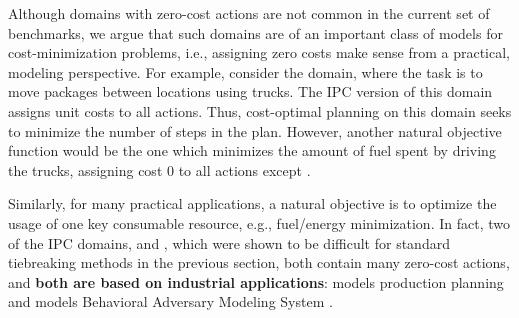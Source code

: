 
Although domains with zero-cost actions are not common in the current set of benchmarks, we argue that such domains are of an important class of models for cost-minimization problems, i.e.,
assigning zero costs make sense from a practical, modeling perspective.
For example, consider the  domain, where the task is to move packages between locations using trucks.
The IPC version of this domain assigns unit costs to all actions. Thus, cost-optimal planning on this domain seeks to minimize the number of steps in the plan.
However, another natural objective function would be the one which minimizes the amount of fuel spent by driving the trucks,
assigning cost 0 to all actions except .


Similarly, for many practical applications, a natural objective is to
optimize the usage of one key consumable resource, e.g., fuel/energy
minimization.  In fact, two of the IPC domains,  and
, which were shown to be difficult for standard tiebreaking
methods in the previous section, both contain many zero-cost actions,
and \textbf{both are based on industrial applications}:  models
production planning \cite{fink1999applications} and 
models Behavioral Adversary Modeling System \cite[minimizing decryption,
data transfer, etc.]{boddy2005course}.

